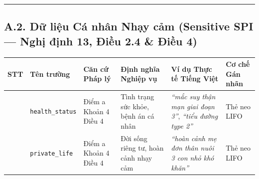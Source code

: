 \documentclass[
  11pt,
  a4paper,
]{article}
\newcounter{none} %
\begin{document}
\begin{center}\rule{0.5\linewidth}{0.5pt}\end{center}

\subsection{A.2. Dữ liệu Cá nhân Nhạy cảm (Sensitive SPI --- Nghị định 13, Điều 2.4 \& Điều
4)}\label{a.2.-dux1eef-liux1ec7u-cuxe1-nhuxe2n-nhux1ea1y-cux1ea3m-sensitive-spi-nghux1ecb-ux111ux1ecbnh-13-ux111iux1ec1u-2.4-ux111iux1ec1u-4}

{\def\LTcaptype{none} %
\begin{longtable}[]{@{}
  >{\centering\arraybackslash}p{}
  >{\raggedright\arraybackslash}p{}
  >{\raggedright\arraybackslash}p{}
  >{\raggedright\arraybackslash}p{}
  >{\raggedright\arraybackslash}p{}
  >{\raggedright\arraybackslash}p{}@{}}
\toprule\noalign{}
\begin{minipage}[b]{\linewidth}\centering
STT
\end{minipage} & \begin{minipage}[b]{\linewidth}\raggedright
Tên trường
\end{minipage} & \begin{minipage}[b]{\linewidth}\raggedright
Căn cứ Pháp lý
\end{minipage} & \begin{minipage}[b]{\linewidth}\raggedright
Định nghĩa Nghiệp vụ
\end{minipage} & \begin{minipage}[b]{\linewidth}\raggedright
Ví dụ Thực tế Tiếng Việt
\end{minipage} & \begin{minipage}[b]{\linewidth}\raggedright
Cơ chế Gán nhãn
\end{minipage} \\
\midrule\noalign{}
\endhead
\bottomrule\noalign{}
\endlastfoot
19 & \texttt{health\_status} & Điểm a Khoản 4 Điều 4 & Tình trạng sức khỏe, bệnh án cá nhân &
\emph{``mắc suy thận mạn giai đoạn 3''}, \emph{``tiểu đường type 2''} & Thẻ neo LIFO \\
20 & \texttt{private\_life} & Điểm a Khoản 4 Điều 4 & Đời sống riêng tư, hoàn cảnh nhạy cảm &
\emph{``hoàn cảnh mẹ đơn thân nuôi 3 con nhỏ khó khăn''} & Thẻ neo LIFO \\

\end{longtable}}
\end{document}
